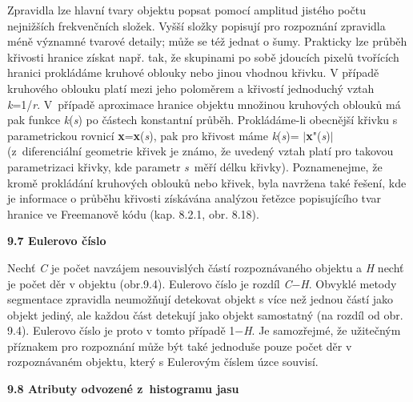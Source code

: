 \noindent Zpravidla lze hlavní tvary objektu popsat pomocí amplitud jistého počtu nejnižších frekvenčních složek. Vyšší složky popisují pro rozpoznání zpravidla méně významné tvarové detaily; může se též jednat o šumy. Prakticky lze průběh křivosti hranice získat např. tak, že skupinami po sobě jdoucích pixelů tvořících hranici prokládáme kruhové oblouky nebo jinou vhodnou křivku. V případě kruhového oblouku platí mezi jeho poloměrem a křivostí jednoduchý vztah \textit{k}=1/\textit{r}. V~případě aproximace hranice objektu množinou kruhových oblouků má pak funkce \textit{k}(\textit{s}) po částech konstantní průběh. Prokládáme-li obecnější křivku s parametrickou rovnicí \textbf{x}=\textbf{x}(\textit{s}), pak pro křivost máme \textit{k}(\textit{s})= $\mid$\textbf{x}"(\textit{s})$\mid$ (z~diferenciální geometrie křivek je známo, že uvedený vztah platí pro takovou parametrizaci křivky, kde parametr \textit{s}~měří délku křivky). Poznamenejme, že kromě prokládání kruhových oblouků nebo křivek, byla navržena také řešení, kde je informace o průběhu křivosti získávána analýzou řetězce popisujícího tvar hranice ve Freemanově kódu (kap. 8.2.1, obr. 8.18).

\noindent \textbf{9.7  Eulerovo číslo}

\noindent 

\noindent Nechť \textit{C} je počet navzájem nesouvislých částí rozpoznávaného objektu a \textit{H} nechť je počet děr v objektu (obr.9.4). Eulerovo číslo je rozdíl \textit{C}$-$\textit{H}. Obvyklé metody segmentace zpravidla neumožňují detekovat objekt s více než jednou částí jako objekt jediný, ale každou část detekují jako objekt samostatný (na rozdíl od obr. 9.4). Eulerovo číslo je proto v tomto případě 1$-$\textit{H}. Je samozřejmé, že užitečným příznakem pro rozpoznání může být také jednoduše pouze počet děr v rozpoznávaném objektu, který s Eulerovým číslem úzce souvisí.

\noindent \textbf{}

\noindent \textbf{9.8  Atributy odvozené z~histogramu jasu}

